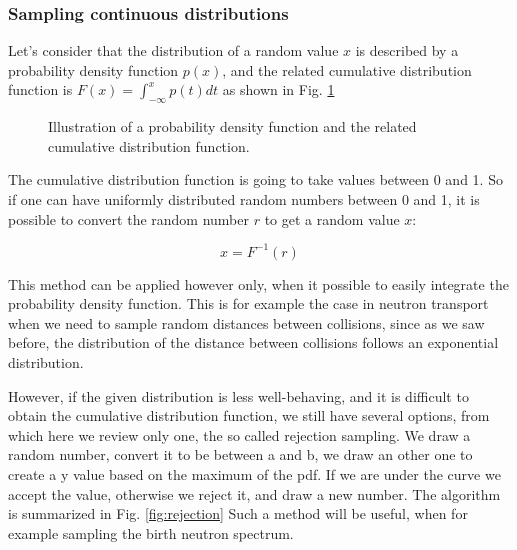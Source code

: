 \subsubsection{Sampling continuous distributions}

Let's consider that the distribution of a random value $x$ is described by a probability density function $p(x)$, and the related cumulative distribution function is $F(x)=\int_{-\infty}^xp(t)dt$ as shown in Fig. \ref{fig:pdfcdf}

\begin{figure}[ht!]
\protect {}\protect
\caption{\label{fig:pdfcdf} \footnotesize{Illustration of a probability density function and the related cumulative distribution function.}}
\end{figure}

The cumulative distribution function is going to take values between 0 and 1. So if one can have uniformly distributed random numbers between 0 and 1, it is possible to convert the random number $r$ to get a random value $x$:

\[
x=F^{-1}(r)
\]


This method can be applied however only, when it possible to easily integrate the probability density function. This is for example the case in neutron transport when we need to sample random distances between collisions, since as we saw before, the distribution of the distance between collisions follows an exponential distribution. 

However, if the given distribution is less well-behaving, and it is difficult to obtain the cumulative distribution function, we still have several options, from which here we review only one, the so called rejection sampling. We draw a random number, convert it to be between a and b, we draw an other one to create a y value based on the maximum of the pdf. If we are under the curve we accept the value, otherwise we reject it, and draw a new number. The algorithm is summarized in Fig. \ref{fig:rejection} Such a method will be useful, when for example sampling the birth neutron spectrum.

